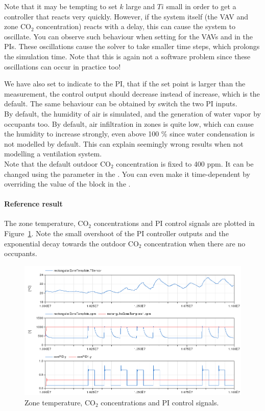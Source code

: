 \documentclass[10pt,a4paper]{article}
\begin{document}
Note that it may be tempting to set $k$ large and $Ti$ small
in order to get a controller that reacts very quickly. However,
if the system itself (the VAV and zone CO$_2$ concentration)
reacts with a delay, this can cause the system to oscillate.
You  can observe such behaviour when setting  for the VAVs and
 in the PIs.
These oscillations cause the solver to take smaller time steps, 
which prolongs the simulation time.
Note that this is again not a software problem since these oscillations can occur 
in practice too!

We have also set  to indicate to the PI,
that if the set point is larger than the measurement, the control output should
decrease instead of increase, which is the default. The same behaviour
can be obtained by  switch the two PI inputs.\\


By default, the humidity of air is simulated, and the generation of water
vapor by occupants too.
By default, air infiltration in zones is quite low, which can cause the
humidity to increase strongly, even above 100 \% since water condensation
is not modelled by default.
This can explain seemingly wrong results when not modelling
a ventilation system.\\

Note that the default outdoor CO$_2$ concentration is fixed to 400 ppm.
It can be changed using the parameter  in the 
. You can even make it time-dependent
by overriding the value of the  block 
in the .

\paragraph{Reference result}
The zone temperature, CO$_2$ concentrations and 
PI control signals are plotted in Figure~\ref{fig:res4}.
Note the small overshoot of the PI controller outputs
and the exponential decay towards the outdoor CO$_2$
concentration when there are no occupants.


\begin{figure}
\centering
\includegraphics[scale=0.7]{Example9.png}
\caption{Zone temperature, CO$_2$ concentrations and PI control signals.}
\label{fig:res4}
\end{figure}
\end{document}
